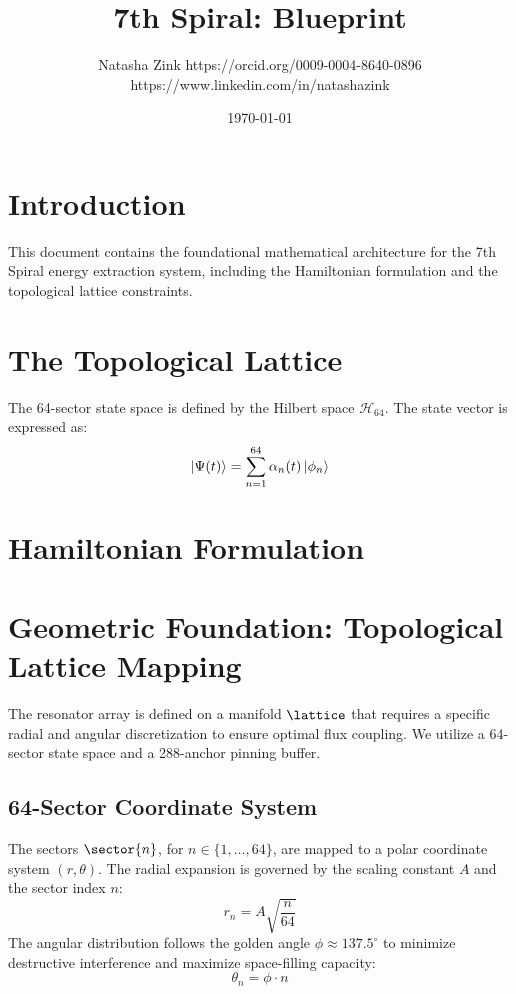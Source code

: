 \documentclass[12pt]{article}
\title{7th Spiral: Blueprint}
\author{Natasha Zink 
https://orcid.org/0009-0004-8640-0896
https://www.linkedin.com/in/natashazink}
\date{\today}
\begin{document}
\maketitle

\section{Introduction}
This document contains the foundational mathematical architecture for the 7th Spiral energy extraction system, including the Hamiltonian formulation and the topological lattice constraints.

\section{The Topological Lattice}
The 64-sector state space is defined by the Hilbert space $\mathcal{H}_{64}$. The state vector is expressed as:
\begin{equation}
    \ket{\Psi(t)} = \sum_{n=1}^{64} \alpha_n(t) \ket{\phi_n}
\end{equation}

\section{Hamiltonian Formulation}
\section{Geometric Foundation: Topological Lattice Mapping}

The resonator array is defined on a manifold $\lattice$ that requires a specific radial and angular discretization to ensure optimal flux coupling. We utilize a 64-sector state space and a 288-anchor pinning buffer.

\subsection{64-Sector Coordinate System}
The sectors $\sector{n}$, for $n \in \{1, \dots, 64\}$, are mapped to a polar coordinate system $(r, \theta)$. The radial expansion is governed by the scaling constant $A$ and the sector index $n$:
\begin{equation}
    r_n = A \sqrt{\frac{n}{64}}
\end{equation}
The angular distribution follows the golden angle $\phi \approx 137.5^\circ$ to minimize destructive interference and maximize space-filling capacity:
\begin{equation}
    \theta_n = \phi \cdot n
\end{equation}
\end{document}
